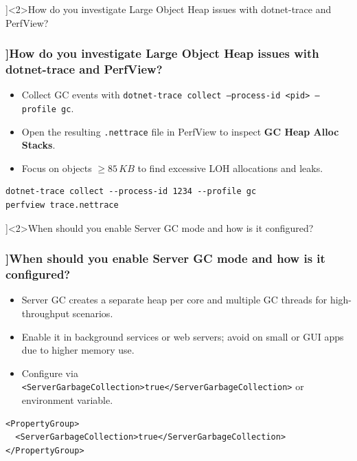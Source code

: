 \QuestionSlide[\CategoryBadge[AuthColor!20]{Cloud}]<2>{How do you investigate Large Object Heap issues with dotnet-trace and PerfView?}
\begin{frame}[fragile]
  \frametitle{\AnswerTitle[\CategoryBadge[AuthColor!20]{Cloud}]{How do you investigate Large Object Heap issues with dotnet-trace and PerfView?}}

  {\footnotesize
  \begin{itemize}
    \item Collect GC events with \texttt{dotnet-trace collect --process-id <pid> --profile gc}.
    \item Open the resulting \texttt{.nettrace} file in PerfView to inspect \textbf{GC Heap Alloc Stacks}.
    \item Focus on objects \(\geq 85\,KB\) to find excessive LOH allocations and leaks.
  \end{itemize}
  }

  \begin{verbatim}
dotnet-trace collect --process-id 1234 --profile gc
perfview trace.nettrace
  \end{verbatim}
\end{frame}

\QuestionSlide[\CategoryBadge[AuthColor!20]{Cloud}]<2>{When should you enable Server GC mode and how is it configured?}
\begin{frame}[fragile]
  \frametitle{\AnswerTitle[\CategoryBadge[AuthColor!20]{Cloud}]{When should you enable Server GC mode and how is it configured?}}

  {\footnotesize
  \begin{itemize}
    \item Server GC creates a separate heap per core and multiple GC threads for high-throughput scenarios.
    \item Enable it in background services or web servers; avoid on small or GUI apps due to higher memory use.
    \item Configure via \texttt{<ServerGarbageCollection>true</ServerGarbageCollection>} or environment variable.
  \end{itemize}
  }

  \begin{verbatim}
<PropertyGroup>
  <ServerGarbageCollection>true</ServerGarbageCollection>
</PropertyGroup>
  \end{verbatim}
\end{frame}

